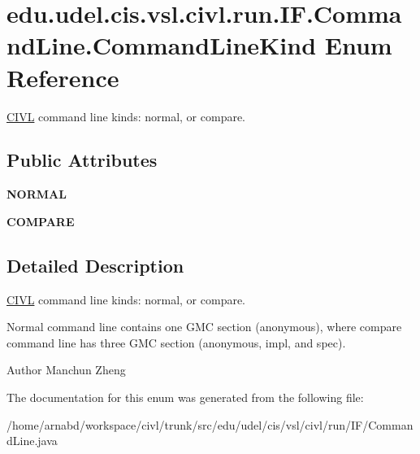 \hypertarget{enumedu_1_1udel_1_1cis_1_1vsl_1_1civl_1_1run_1_1IF_1_1CommandLine_1_1CommandLineKind}{}\section{edu.\+udel.\+cis.\+vsl.\+civl.\+run.\+I\+F.\+Command\+Line.\+Command\+Line\+Kind Enum Reference}
\label{enumedu_1_1udel_1_1cis_1_1vsl_1_1civl_1_1run_1_1IF_1_1CommandLine_1_1CommandLineKind}


\hyperlink{classedu_1_1udel_1_1cis_1_1vsl_1_1civl_1_1CIVL}{C\+I\+V\+L} command line kinds\+: normal, or compare.  


\subsection*{Public Attributes}
\begin{DoxyCompactItemize}
\item 
\hypertarget{enumedu_1_1udel_1_1cis_1_1vsl_1_1civl_1_1run_1_1IF_1_1CommandLine_1_1CommandLineKind_adafc6ad6e9568c01c22604334749edf3}{}{\bfseries N\+O\+R\+M\+A\+L}\label{enumedu_1_1udel_1_1cis_1_1vsl_1_1civl_1_1run_1_1IF_1_1CommandLine_1_1CommandLineKind_adafc6ad6e9568c01c22604334749edf3}

\item 
\hypertarget{enumedu_1_1udel_1_1cis_1_1vsl_1_1civl_1_1run_1_1IF_1_1CommandLine_1_1CommandLineKind_a22ca0393b471dc629e7ecefa0281eff3}{}{\bfseries C\+O\+M\+P\+A\+R\+E}\label{enumedu_1_1udel_1_1cis_1_1vsl_1_1civl_1_1run_1_1IF_1_1CommandLine_1_1CommandLineKind_a22ca0393b471dc629e7ecefa0281eff3}

\end{DoxyCompactItemize}


\subsection{Detailed Description}
\hyperlink{classedu_1_1udel_1_1cis_1_1vsl_1_1civl_1_1CIVL}{C\+I\+V\+L} command line kinds\+: normal, or compare. 

Normal command line contains one G\+M\+C section (anonymous), where compare command line has three G\+M\+C section (anonymous, impl, and spec).

\begin{DoxyAuthor}{Author}
Manchun Zheng 
\end{DoxyAuthor}


The documentation for this enum was generated from the following file\+:\begin{DoxyCompactItemize}
\item 
/home/arnabd/workspace/civl/trunk/src/edu/udel/cis/vsl/civl/run/\+I\+F/Command\+Line.\+java\end{DoxyCompactItemize}
